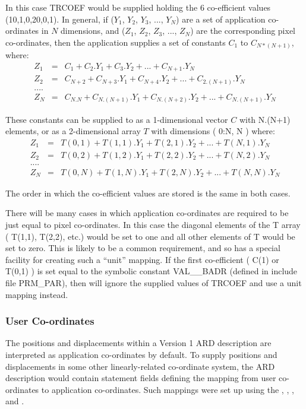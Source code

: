 In this case TRCOEF would be supplied holding the 6 co-efficient values
(10,1,0,20,0,1). In general, if ($Y_{1}$, $Y_{2}$, $Y_{3}$, ..., $Y_{N}$) are a
set of application co-ordinates in $N$ dimensions, and ($Z_{1}$, $Z_{2}$,
$Z_{3}$, ..., $Z_{N}$) are the corresponding pixel co-ordinates, then the
application supplies a set of constants $C_{1}$ to $C_{N*(N+1)}$, where: 
\small
\begin{eqnarray*}
Z_{1} & = & C_{1} + C_{2}.Y_{1} + C_{3}.Y_{2} + ... + C_{N+1}.Y_{N} \\
Z_{2} & = & C_{N+2} + C_{N+3}.Y_{1} + C_{N+4}.Y_{2} + ... + C_{2.(N+1)}.Y_{N} \\
 ....\\
Z_{N} & = & C_{N.N} + C_{N.(N+1)}.Y_{1} + C_{N.(N+2)}.Y_{2} + ... + C_{N.(N+1)}.Y_{N} 
\end{eqnarray*}
\normalsize

These constants can be supplied to  as a 1-dimensional vector 
$C$ with N.(N+1) elements, or as a 2-dimensional array $T$ with dimensions 
( 0:N, N ) where:
\small
\begin{eqnarray*}
Z_{1} & = & T(0,1) + T(1,1).Y_{1} + T(2,1).Y_{2} + ... + T(N,1).Y_{N} \\
Z_{2} & = & T(0,2) + T(1,2).Y_{1} + T(2,2).Y_{2} + ... + T(N,2).Y_{N} \\
 ....\\
Z_{N} & = & T(0,N) + T(1,N).Y_{1} + T(2,N).Y_{2} + ... + T(N,N).Y_{N} 
\end{eqnarray*}
\normalsize

The order in which the co-efficient values are stored is the same in both
cases.

There will be many cases in which application co-ordinates are required to be
just equal to pixel co-ordinates. In this case the diagonal elements of the T
array ( T(1,1), T(2,2), etc.) would be set to one and all other elements of T
would be set to zero. This is likely to be a common requirement, and so
 has a special facility for creating such a ``unit'' mapping. If the
first co-efficient ( C(1) or T(0,1) ) is set equal to the symbolic constant
VAL\_\_BADR (defined in include file PRM\_PAR), then  will ignore the
supplied values of TRCOEF and use a unit mapping instead.

\subsubsection{User Co-ordinates}
The positions and displacements within a Version 1 ARD description are 
interpreted as
application co-ordinates by default. To supply positions
and displacements in some other linearly-related co-ordinate system, the ARD 
description would contain statement fields defining the mapping from user
co-ordinates to application co-ordinates. Such mappings were set up using the 
, 
, 
, 
 and
.

